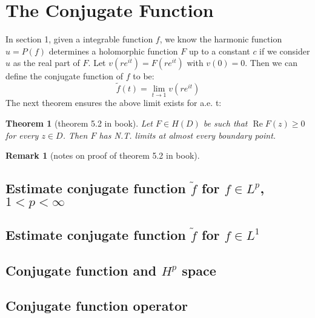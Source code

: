 \documentclass{report}
\newtheorem*{remark}{Remark}
\newtheorem{theorem}{Theorem}
\numberwithin{theorem}{subsection}
\renewcommand{\Re}{\operatorname{Re}}
\begin{document}
\section{The Conjugate Function}
In section 1, given a integrable function $f$, we know the harmonic function $u=P(f)$ determines a holomorphic function $F$ up to a constant $c$ if we consider $u$
as the real part of $F$. Let $v(re^{it})=F(re^{it})$ with $v(0)=0$. Then we can define the conjugate function of $f$ to be:
\begin{equation*}
    \tilde{f}(t)=\lim_{t\to 1}{v(re^{it})}
\end{equation*}
The next theorem ensures the above limit exists for a.e. t:
\begin{theorem}[theorem 5.2 in book]
    Let $F\in H(D)$ be such that $\Re{F(z)}\geq 0$ for every $z\in D$. Then $F$ has N.T. limits at almost every boundary point.
\end{theorem}
\begin{remark}[notes on proof of theorem 5.2 in book]
    
\end{remark}
\subsection{Estimate conjugate function $\tilde{f}$ for $f\in L^p$, $1<p<\infty$}
\subsection{Estimate conjugate function $\tilde{f}$ for $f\in L^1$}
\subsection{Conjugate function and $H^p$ space}
\subsection{Conjugate function operator}
\end{document}
